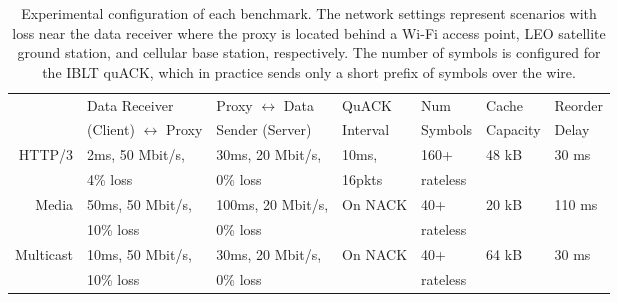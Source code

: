 \begin{table*}
    \centering
    \begin{tabular}{r l l l l l l}
        \toprule
        \bf
        & Data Receiver & Proxy $\leftrightarrow$ Data & QuACK & Num & Cache & Reorder \\
        & (Client) $\leftrightarrow$ Proxy & Sender (Server) &  Interval & Symbols & Capacity & Delay \\
        \midrule
         HTTP/3 & 2ms, 50 Mbit/s, & 30ms, 20 Mbit/s, & 10ms, & 160+ & 48 kB & 30 ms \\
         & 4\% loss & 0\% loss & 16pkts & rateless & & \\
         Media & 50ms, 50 Mbit/s, & 100ms, 20 Mbit/s, & On NACK & 40+ & 20 kB & 110 ms \\
         & 10\% loss & 0\% loss & & rateless & & \\
         Multicast & 10ms, 50 Mbit/s, & 30ms, 20 Mbit/s, & On NACK & 40+ & 64 kB & 30 ms \\
         & 10\% loss & 0\% loss & & rateless & & \\
         \bottomrule
    \end{tabular}
    \caption{Experimental configuration of each benchmark. The network settings
     represent scenarios with loss near the data receiver where the proxy is
     located behind a Wi-Fi access point, LEO satellite ground station, and
     cellular base station, respectively. The number of symbols is configured
     for the IBLT quACK, which in practice sends only a short prefix of symbols
     over the wire.
     }
    \label{tab:experiment-config}
\end{table*}